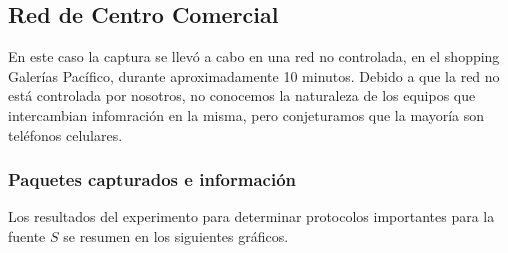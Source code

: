 \subsection{Red de Centro Comercial}

En este caso la captura se llevó a cabo en una red no controlada, en el shopping Galerías Pacífico, durante aproximadamente 10 minutos.
Debido a que la red no está controlada por nosotros, no conocemos la naturaleza de los equipos que intercambian infomración en la misma, pero conjeturamos que la mayoría son teléfonos celulares.

\FloatBarrier

\subsubsection{Paquetes capturados e información}

Los resultados del experimento para determinar protocolos importantes para la fuente $S$ se resumen en los siguientes gráficos.

